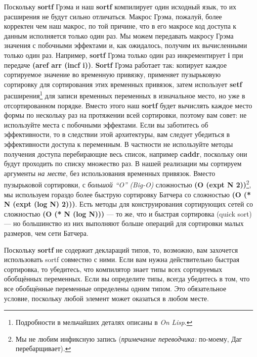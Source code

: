 Поскольку \textbf{sortf} Грэма и наш \textbf{sortf} компилирует один исходный язык, то их расширения не будут сильно отличаться. Макрос Грэма, пожалуй, более корректен чем наш макрос, по той причине, что в его макросе код доступа к данным исполняется только один раз. Мы можем передавать макросу Грэма значения с побочными эффектами и, как ожидалось, получим их вычисленными только один раз. Например, \textbf{sortf} Грэма только один раз инкрементирует \textbf{i} при передаче \textbf{(aref arr (incf i))}. \textbf{Sortf} Грэма работает так: копирует каждое сортируемое значение во временную привязку, применяет пузырьковую сортировку для сортирования этих временных привязок, затем использует \textbf{setf} расширения\footnote{Подробности в мельчайших деталях описаны в \emph{On Lisp}.} для записи временных переменных в изначальное место, но уже в отсортированном порядке. Вместо этого наш \textbf{sortf} будет вычислять каждое место формы по нескольку раз на протяжении всей сортировки, поэтому вам совет: не используйте места с побочными эффектами. Если вы заботитесь об эффективности, то в следствии этой архитектуры, вам следует убедиться в эффективности доступа к переменным. В частности не используйте методы получения доступа перебирающие весь список, например \textbf{caddr}, поскольку они будут проходить по списку множество раз. В нашей реализации мы сортируем аргументы \emph{на месте}, без использования временных привязок. Вместо пузырьковой сортировки, с \emph{большой ``O'' (Big-O)} сложностью \textbf{(O (expt N 2))}\footnote{Мы не любим инфиксную запись (\emph{примечание переводчика:} по-моему, Даг перебарщивает).}, мы используем гораздо более быструю сортировку Батчера со сложностью  \textbf{(O (* N (expt (log N) 2)))}. Есть методы для конструирования сортирующих сетей со сложностью \textbf{(O (* N (log N)))} --- то же, что и быстрая сортировка (quick sort) --- но большинство из них выполняют больше операций для сортировки малых размеров, чем сети Батчера.

Поскольку \textbf{sortf} не содержит деклараций типов, то, возможно, вам захочется использовать sortf совместно с ними. Если вам нужна действительно быстрая сортировка, то убедитесь, что компилятор знает типы всех сортируемых обобщённых переменных. Если вы определите типы, всегда убедитесь в том, что все обобщённые переменные определены одним типом. Это обязательное условие, поскольку любой элемент может оказаться в любом месте.


